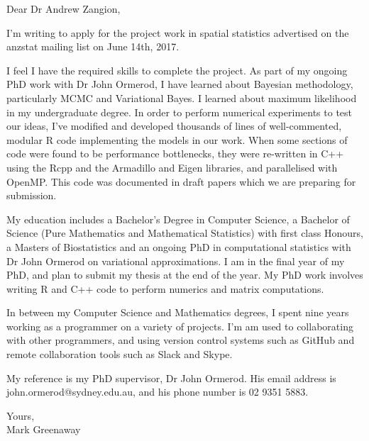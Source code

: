 \documentclass{letter}
\begin{document}
Dear Dr Andrew Zangion,

I'm writing to apply for the project work in spatial statistics advertised on the anzstat mailing list on
June 14th, 2017.

I feel I have the required skills to complete the project.
As part of my ongoing PhD work with Dr John Ormerod, I have learned about Bayesian methodology, particularly
MCMC and Variational Bayes. I learned about maximum likelihood in my undergraduate degree.
In order to perform numerical experiments to test our ideas, I've modified and developed thousands of lines
of well-commented, modular R code implementing the models in our work.
When some sections of code were found to be performance bottlenecks, they were re-written in
C++ using the Rcpp and the Armadillo and Eigen libraries, and parallelised with OpenMP.
This code was documented in draft papers which we are preparing for submission.

My education includes a Bachelor's Degree in Computer Science, a Bachelor of Science (Pure Mathematics and
Mathematical Statistics) with first class Honours, a Masters of Biostatistics and an ongoing PhD in computational 
statistics with Dr John Ormerod on variational approximations. I am in the final year of my PhD,
and plan to submit my thesis at the end of the year. My PhD work involves writing R and C++ code to perform
numerics and matrix computations.

In between my Computer Science and Mathematics degrees, I spent nine years working as a programmer on
a variety of projects.
I'm am used to collaborating with other programmers, and using version control systems such as GitHub and
remote collaboration tools such as Slack and Skype.

My reference is my PhD supervisor, Dr John Ormerod. His email address is john.ormerod@sydney.edu.au, and his
phone number is 02 9351 5883.

Yours, \\
Mark Greenaway
\end{document}
